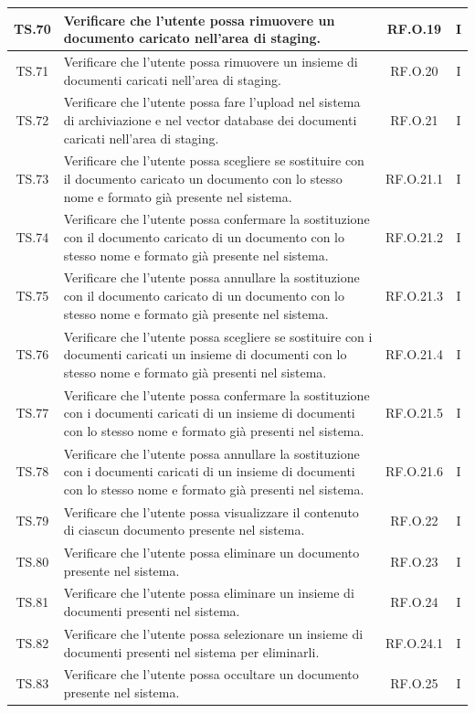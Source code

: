 \documentclass[10pt, a4paper]{article}
\begin{document}
\begin{xltabular}{\textwidth}{|c|X|c|c|}
\hline
TS.70 & Verificare che l'utente possa rimuovere un documento caricato nell’area di staging. & RF.O.19 & I \\
\hline
TS.71 & Verificare che l'utente possa rimuovere un insieme di documenti caricati nell’area di staging. & RF.O.20 & I \\
\hline
TS.72 & Verificare che l'utente possa fare l’upload nel sistema di archiviazione e nel vector database dei documenti caricati nell’area di staging. & RF.O.21 & I \\
\hline
TS.73 & Verificare che l'utente possa scegliere se sostituire con il documento caricato un documento con lo stesso nome e formato già presente nel sistema. & RF.O.21.1 & I \\
\hline
TS.74 & Verificare che l'utente possa confermare la sostituzione con il documento caricato di un documento con lo stesso nome e formato già presente nel sistema. & RF.O.21.2 & I \\
\hline
TS.75 & Verificare che l'utente possa annullare la sostituzione con il documento caricato di un documento con lo stesso nome e formato già presente nel sistema. & RF.O.21.3 & I \\
\hline
TS.76 & Verificare che l'utente possa scegliere se sostituire con i documenti caricati un insieme di documenti con lo stesso nome e formato già presenti nel sistema. & RF.O.21.4 & I \\
\hline
TS.77 & Verificare che l'utente possa confermare la sostituzione con i documenti caricati di un insieme di documenti con lo stesso nome e formato già presenti nel sistema. & RF.O.21.5 & I \\
\hline
TS.78 & Verificare che l'utente possa annullare la sostituzione con i documenti caricati di un insieme di documenti con lo stesso nome e formato già presenti nel sistema. & RF.O.21.6 & I \\
\hline
TS.79 & Verificare che l'utente possa visualizzare il contenuto di ciascun documento presente nel sistema. & RF.O.22 & I \\
\hline
TS.80 & Verificare che l'utente possa eliminare un documento presente nel sistema. & RF.O.23 & I \\
\hline
TS.81 & Verificare che l'utente possa eliminare un insieme di documenti presenti nel sistema. & RF.O.24 & I \\
\hline
TS.82 & Verificare che l'utente possa selezionare un insieme di documenti presenti nel sistema per eliminarli. & RF.O.24.1 & I \\
\hline
TS.83 & Verificare che l'utente possa occultare un documento presente nel sistema. & RF.O.25 & I \\

\end{xltabular}
\end{document}
